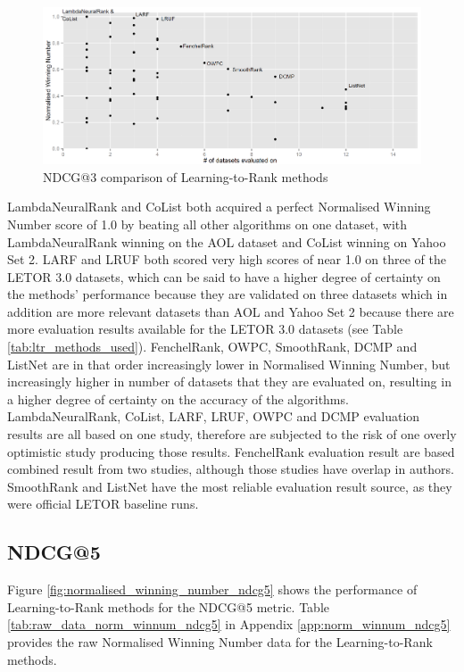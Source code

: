 \documentclass{sig-alternate-2013}
\begin{document}
\begin{figure}[!h]
\includegraphics[scale=0.285]{gfx/ndcg3_winnum}
\caption{NDCG@3 comparison of Learning-to-Rank methods}
\label{fig:normalised_winning_number_ndcg3}
\end{figure}

LambdaNeuralRank and CoList both acquired a perfect Normalised Winning Number score of 1.0 by beating all other algorithms on one dataset, with LambdaNeuralRank winning on the AOL dataset and CoList winning on Yahoo Set 2. LARF and LRUF both scored very high scores of near 1.0 on three of the LETOR 3.0 datasets, which can be said to have a higher degree of certainty on the methods' performance because they are validated on three datasets which in addition are more relevant datasets than AOL and Yahoo Set 2 because there are more evaluation results available for the LETOR 3.0 datasets (see Table \ref{tab:ltr_methods_used}). FenchelRank, OWPC, SmoothRank, DCMP and ListNet are in that order increasingly lower in Normalised Winning Number, but increasingly higher in number of datasets that they are evaluated on, resulting in a higher degree of certainty on the accuracy of the algorithms.\\

LambdaNeuralRank, CoList, LARF, LRUF, OWPC and DCMP evaluation results are all based on one study, therefore are subjected to the risk of one overly optimistic study producing those results. FenchelRank evaluation result are based combined result from two studies, although those studies have overlap in authors. SmoothRank and ListNet have the most reliable evaluation result source, as they were official LETOR baseline runs.  

\subsection{NDCG@5}
Figure \ref{fig:normalised_winning_number_ndcg5} shows the performance of Learning-to-Rank methods for the NDCG@5 metric. Table \ref{tab:raw_data_norm_winnum_ndcg5} in Appendix \ref{app:norm_winnum_ndcg5} provides the raw Normalised Winning Number data for the Learning-to-Rank methods.\\
\end{document}
